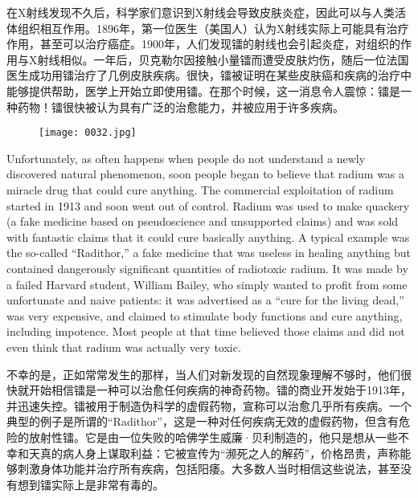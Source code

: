 \documentclass[dvipsnames, svgnames,a4paper,11pt]{article}
\begin{document}
在X射线发现不久后，科学家们意识到X射线会导致皮肤炎症，因此可以与人类活体组织相互作用。1896年，第一位医生（美国人）认为X射线实际上可能具有治疗作用，甚至可以治疗癌症。1900年，人们发现镭的射线也会引起炎症，对组织的作用与X射线相似。一年后，贝克勒尔因接触小量镭而遭受皮肤灼伤，随后一位法国医生成功用镭治疗了几例皮肤疾病。很快，镭被证明在某些皮肤癌和疾病的治疗中能够提供帮助，医学上开始立即使用镭。在那个时候，这一消息令人震惊：镭是一种药物！镭很快被认为具有广泛的治愈能力，并被应用于许多疾病。

\begin{figure}[htbp]
      \centering
      \texttt{[image: 0032.jpg]}
       \label{fig19}
\end{figure}


Unfortunately, as often happens when people do not understand a newly discovered natural phenomenon, soon people began to believe that radium was a miracle drug that could cure anything. The commercial exploitation of radium started in 1913 and soon went out of control. Radium was used to make quackery (a fake medicine based on pseudoscience and unsupported claims) and was sold with fantastic claims that it could cure basically anything. A typical example was the so-called “Radithor,” a fake medicine that was useless in healing anything but contained dangerously significant quantities of radiotoxic radium. It was made by a failed Harvard student, William Bailey, who simply wanted to profit from some unfortunate and naive patients: it was advertised as a “cure for the living dead,” was very expensive, and claimed to stimulate body functions and cure anything, including impotence. Most people at that time believed those claims and did not even think that radium was actually very toxic.

不幸的是，正如常常发生的那样，当人们对新发现的自然现象理解不够时，他们很快就开始相信镭是一种可以治愈任何疾病的神奇药物。镭的商业开发始于1913年，并迅速失控。镭被用于制造伪科学的虚假药物，宣称可以治愈几乎所有疾病。一个典型的例子是所谓的“Radithor”，这是一种对任何疾病无效的虚假药物，但含有危险的放射性镭。它是由一位失败的哈佛学生威廉·贝利制造的，他只是想从一些不幸和天真的病人身上谋取利益：它被宣传为“濒死之人的解药”，价格昂贵，声称能够刺激身体功能并治疗所有疾病，包括阳痿。大多数人当时相信这些说法，甚至没有想到镭实际上是非常有毒的。
\end{document}
